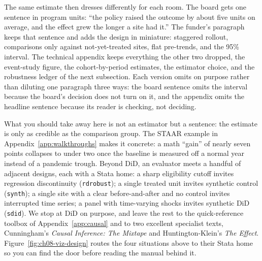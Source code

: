\documentclass[
    a4paper,
    fontsize=10pt,
    twoside=true,
    numbers=noenddot,
]{kaobook}
\begin{document}
The same estimate then dresses differently for each room. The board gets one sentence in program units: \enquote{the policy raised the outcome by about five units on average, and the effect grew the longer a site had it.} The funder's paragraph keeps that sentence and adds the design in miniature: staggered rollout, comparisons only against not-yet-treated sites, flat pre-trends, and the 95\% interval. The technical appendix keeps everything the other two dropped, the event-study figure, the cohort-by-period estimates, the estimator choice, and the robustness ledger of the next subsection. Each version omits on purpose rather than diluting one paragraph three ways: the board sentence omits the interval because the board's decision does not turn on it, and the appendix omits the headline sentence because its reader is checking, not deciding.

What you should take away here is not an estimator but a sentence: the estimate is only as credible as the comparison group. The STAAR example in Appendix~\ref{app:walkthroughs} makes it concrete: a math \enquote{gain} of nearly seven points collapses to under two once the baseline is measured off a normal year instead of a pandemic trough. Beyond DiD, an evaluator meets a handful of adjacent designs, each with a Stata home: a sharp eligibility cutoff invites regression discontinuity (\texttt{rdrobust}); a single treated unit invites synthetic control (\texttt{synth}); a single site with a clear before-and-after and no control invites interrupted time series; a panel with time-varying shocks invites synthetic DiD (\texttt{sdid}). We stop at DiD on purpose, and leave the rest to the quick-reference toolbox of Appendix~\ref{app:causal} and to two excellent specialist texts, Cunningham's \emph{Causal Inference: The Mixtape} and Huntington-Klein's \emph{The Effect}. Figure~\ref{fig:ch08-viz-design} routes the four situations above to their Stata home so you can find the door before reading the manual behind it.
\end{document}
